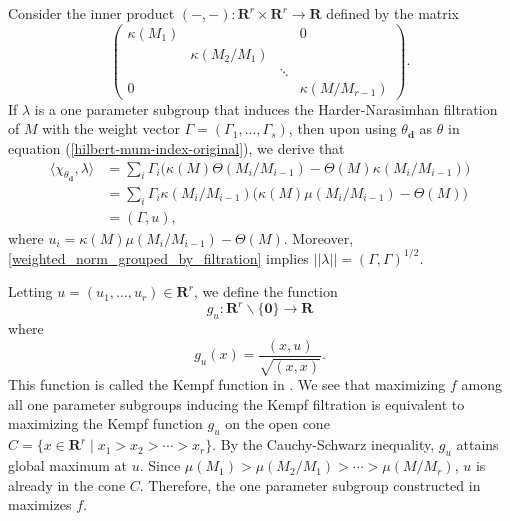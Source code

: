 \documentclass[a4paper]{amsart}
\numberwithin{equation}{section}
\theoremstyle{plain}
\theoremstyle{definition}
\begin{document}
Consider the inner product $(-,-):\mathbf{R}^{r}\times\mathbf{R}^{r}\rightarrow\mathbf{R}$ defined by the matrix 
$$
\begin{pmatrix}
\kappa(M_1)&&&0\\
&\kappa(M_2/M_1)&&\\
&&\ddots&\\
0&&&\kappa(M/M_{r-1})
\end{pmatrix}.
$$
If $\lambda$ is a one parameter subgroup that induces the Harder-Narasimhan filtration of $M$ with the weight vector $\Gamma=(\Gamma_1,\ldots,\Gamma_s)$, then 
upon using $\theta_{\mathbf{d}}$ as $\theta$ in equation (\ref{hilbert-mum-index-original}),  we derive that 
\begin{equation}\label{hilbert-mumford-index-weighted}
\begin{split}
\langle\chi_{\theta_{\mathbf{d}}},\lambda\rangle&=\sum_{i}\Gamma_{i}\big(\kappa(M)\Theta(M_i/M_{i-1})-\Theta(M)\kappa(M_i/M_{i-1})\big)\\
&=\sum_i\Gamma_i\kappa(M_i/M_{i-1})\big(\kappa(M)\mu(M_i/M_{i-1})-\Theta(M)\big)\\
&=(\Gamma,u),
\end{split}
\end{equation}
where $u_i=\kappa(M)\mu(M_i/M_{i-1})-\Theta(M)$. Moreover, \cref{weighted_norm_grouped_by_filtration}  implies $||\lambda||=(\Gamma,\Gamma)^{1/2}$. 

Letting $u=(u_1,\ldots,u_r)\in\mathbf{R}^{r}$, we define the function $$g_{u}:\mathbf{R}^{r}\backslash\{\mathbf{0\}}\rightarrow\mathbf{R}$$ where $$g_u(x)=\frac{(x,u)}{\sqrt{(x,x)}}.$$ This function is called the Kempf function in \cite{MR3199484}. We see that maximizing  $f$ among all one parameter subgroups inducing the Kempf filtration is equivalent to maximizing the Kempf function $g_u$ on the open cone $C=\{x\in\mathbf{R}^{r}\mid x_1>x_2>\cdots>x_r\}.$ By the Cauchy-Schwarz inequality, $g_u$ attains global maximum at $u$. Since $\mu(M_1)>\mu(M_2/M_1)>\cdots>\mu(M/M_r)$, $u$ is already in the cone $C$. Therefore, the one parameter subgroup constructed in  maximizes $f$.
\end{document}
